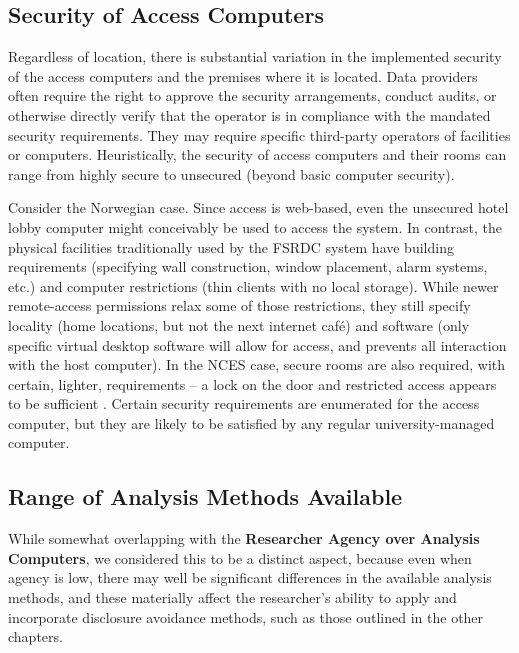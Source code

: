 \subsection{Security of Access Computers}

Regardless of location, there is substantial variation in the implemented security of the access computers and the premises where it is located.  Data providers often require the right to approve the security arrangements, conduct audits, or otherwise directly verify that the operator is in compliance with the mandated security requirements. They may require specific third-party operators of facilities or computers. Heuristically, the security of access computers and their rooms can range from highly secure to unsecured (beyond basic computer security).

Consider the Norwegian case. Since access is web-based, even the unsecured hotel lobby computer might conceivably be used to access the system. In contrast, the physical facilities traditionally used by the FSRDC system have building requirements (specifying wall construction, window placement, alarm systems, etc.) and computer restrictions (thin clients with no local storage). While newer remote-access permissions relax some of those restrictions, they still specify locality (home locations, but not the next internet café) and software (only specific virtual desktop software will allow for access, and prevents all interaction with the host computer). In the NCES case, secure rooms are also required, with certain, lighter, requirements -- a lock on the door and restricted access appears to be sufficient \cite{national_center_for_education_statistics_appendix_nodate}. Certain security requirements are enumerated for the access computer, but they are likely to be satisfied by any regular university-managed computer.

\subsection{Range of Analysis Methods Available}

While somewhat overlapping with the \textbf{Researcher Agency over Analysis Computers}, we considered this to be a distinct aspect, because even when agency is low, there may well be significant differences in the available analysis methods, and these materially affect the researcher's ability to apply and incorporate disclosure avoidance methods, such as those outlined in the other chapters. 

